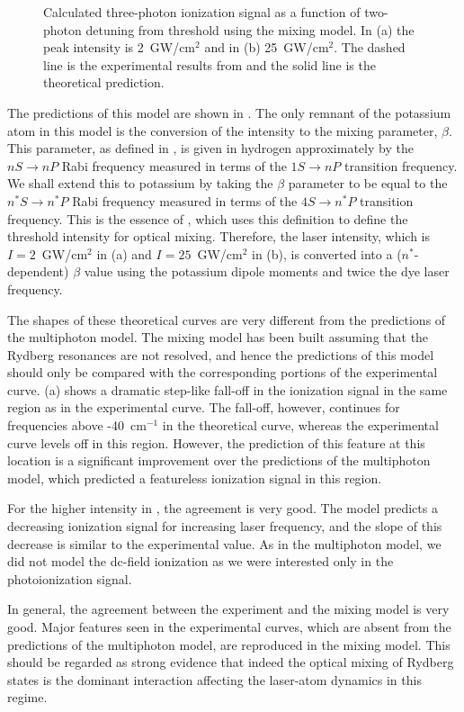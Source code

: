 \begin{figure}[tbp]
\bigskip
{}
{Calculated three-photon ionization signal as a function of two-photon detuning
from threshold using the mixing model.  In (a) the peak intensity is
2~GW/cm$^2$ and in (b) 25~GW/cm$^{2}$.  The dashed line is the experimental
results from  and the solid line is the theoretical prediction.
\label{mix_thy2}}
\end{figure}

The predictions of this model are shown in .  The only remnant of
the potassium atom in this model is the conversion of the intensity to the
mixing parameter, $\beta$.  This parameter, as defined in , is
given in hydrogen approximately by the $nS \rightarrow nP$ Rabi frequency
measured in terms of the $1S \rightarrow nP$ transition frequency.  We shall
extend this to potassium by taking the $\beta$ parameter to be equal to the
$n^*S \rightarrow n^*P$ Rabi frequency measured in terms of the
$4S \rightarrow n^*P$ transition frequency.  This is the essence of
, which uses this definition to define the threshold intensity for
optical mixing.  Therefore, the laser intensity, which is $I=2$~GW/cm$^2$ in
(a) and $I=25$~GW/cm$^2$ in (b), is converted into
a ($n^*$-dependent) $\beta$ value using the potassium dipole moments and twice
the dye laser frequency.

The shapes of these theoretical curves are very different from the predictions
of the multiphoton model. The mixing model has been built assuming that the
Rydberg resonances are not resolved, and hence the predictions of this model
should only be compared with the corresponding portions of the experimental
curve.  (a) shows a dramatic step-like fall-off in the
ionization signal in the same region as in the experimental curve.  The
fall-off, however, continues for frequencies above -40~cm$^{-1}$ in the
theoretical curve, whereas the experimental curve levels off in this region. 
However, the prediction of this feature at this location is a significant
improvement over the predictions of the multiphoton model, which predicted a
featureless ionization signal in this region.

For the higher intensity in , the agreement is very good.  The
model predicts a decreasing ionization signal for increasing laser frequency,
and the slope of this decrease is similar to the experimental value.  As in the
multiphoton model, we did not model the dc-field ionization as we were
interested only in the photoionization signal.

In general, the agreement between the experiment and the mixing model is very
good.  Major features seen in the experimental curves, which are absent from
the predictions of the multiphoton model, are reproduced in the mixing
model.  This should be regarded as strong evidence that indeed the optical
mixing of Rydberg states is the dominant interaction affecting the laser-atom
dynamics in this regime.




